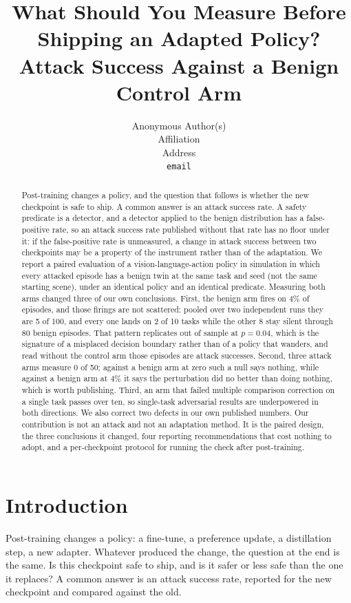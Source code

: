 \documentclass{article}
\title{What Should You Measure Before Shipping an Adapted Policy?\\
  Attack Success Against a Benign Control Arm}
\author{Anonymous Author(s)\\
  Affiliation\\
  Address\\
  \texttt{email}}
\begin{document}
\maketitle

\begin{abstract}
Post-training changes a policy, and the question that follows is whether the new checkpoint is
safe to ship. A common answer is an attack success rate. A safety predicate is a detector, and a
detector applied to the benign distribution has a false-positive rate, so an attack success rate
published without that rate has no floor under it: if the false-positive rate is unmeasured, a
change in attack success between two checkpoints may be a property of the instrument rather than
of the adaptation. We report a paired evaluation of a vision-language-action policy in simulation
in which
every attacked episode has a benign twin at the same task and seed (not the same starting scene),
under an identical policy and
an identical predicate. Measuring both arms changed three of our own conclusions. First, the benign
arm fires on 4\% of episodes, and those firings are not scattered: pooled over two independent
runs they are 5 of 100, and every one lands on 2 of 10 tasks while the other 8 stay silent through
80 benign episodes. That pattern replicates out of sample at $p=0.04$, which is the signature of a
misplaced decision boundary rather than of a policy that wanders, and read without the control arm
those episodes are attack successes. Second, three attack arms measure 0 of 50; against a benign
arm at zero such a null says nothing, while against a benign arm at 4\% it says the perturbation
did no better than doing nothing, which is worth publishing. Third, an arm that failed multiple
comparison correction on a single task passes over ten, so single-task adversarial results are
underpowered in both directions. We also correct two defects in our own published numbers. Our
contribution is not an attack and not an adaptation method. It is the paired design, the three
conclusions it changed, four reporting recommendations that cost nothing to adopt, and a
per-checkpoint protocol for running the check after post-training.
\end{abstract}

\section{Introduction}

Post-training changes a policy: a fine-tune, a preference update, a distillation step, a new
adapter. Whatever produced the change, the question at the end is the same. Is this checkpoint
safe to ship, and is it safer or less safe than the one it replaces? A common answer is an attack
success rate, reported for the new checkpoint and compared against the old.
\end{document}
